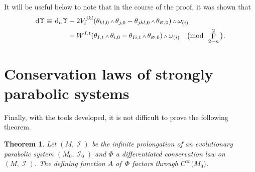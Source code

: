 \documentclass[10pt,a4paper]{amsart}
\DeclareMathOperator{\I}{\mathcal{I}}
\renewcommand{\d}{{\rm d}}
\newcommand{\cinfinity}[1]{C^\infty\big(#1\big)}
\renewcommand{\mod}[1]{\quad\big(\mathrm{mod\enspace} #1\big)}
\newcommand{\w}{{\mathchoice{\,{\scriptstyle\wedge}\,}{{\scriptstyle\wedge}}
 {{\scriptscriptstyle\wedge}}{{\scriptscriptstyle\wedge}}}}
\newcommand{\thetas}[1]{\theta_{#1}}
\newcommand{\thetanot}{\thetas{\varnothing,0}}
\newcommand{\omegas}[1]{\omega_{(#1)}}
\DeclareMathOperator{\pwf}{F}
\renewcommand{\dh}{\ensuremath{\hspace{1pt} \d_h}}
\numberwithin{equation}{section}
\newtheorem{Theorem}{Theorem}[section]
\begin{document}
\begin{Remark}\label{rmk: dvUpsilon}
 It will be useful below to note that in the course of the proof, it was shown that
 \begin{align*}
 \d\Upsilon \equiv \dh\Upsilon & - 2V_i^{jkl}(\thetas{kl,0}\w\thetas{j,0} - \thetas{jkl,0}\w\thetanot)\w\omegas{i} \\
 & - W^{I,t}(\thetas{I,t}\w\thetas{i,0} - \thetas{Ii,t}\w\thetanot)\w\omegas{i} \mod{\pwf^2_{2-n}}.
 \end{align*}
\end{Remark}

\section{Conservation laws of strongly parabolic systems}\label{sec:Conservation laws of strong parabolic}
Finally, with the tools developed, it is not difficult to prove the following theorem.
\begin{Theorem}\label{thm:Jacobi potential lives on M_0}
 Let $(M,\I)$ be the infinite prolongation of an evolutionary parabolic system $(M_0,\I_0)$ and
 $\Phi$ a differentiated conservation law on $(M,\I)$. The defining function $A$ of~$\Phi$ factors through $\cinfinity{M_0}$.
\end{Theorem}
\end{document}
